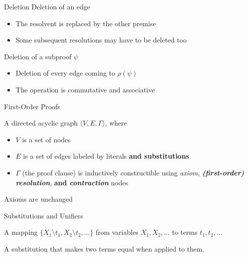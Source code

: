 {
\begin{frame}{Deletion}
Deletion of an edge\\
\begin{itemize}
\item The resolvent is replaced by the other premise
\item Some subsequent resolutions may have to be deleted too
\end{itemize}
\vspace{1cm}
Deletion of a subproof $\psi$\\
\begin{itemize}
\item Deletion of every edge coming to $\rho(\psi)$
\item The operation is commutative and associative
\end{itemize}
\end{frame}
}


{
\begin{frame}{First-Order Proofs}
\begin{definition}
A directed acyclic graph $\langle V,E,\Gamma \rangle$, where
\begin{itemize}
\item $V$ is a set of nodes
\item $E$ is a set of edges labeled by literals {\bf and substitutions}
\item $\Gamma$ (the proof clause) is inductively constructible using \emph{axiom}, {\bf\emph{(first-order) resolution}}, {\bf and \emph{contraction}} nodes
\end{itemize}
\end{definition}
\vspace{0.5cm}
Axioms are unchanged
\end{frame}
}

{
\begin{frame}{Substitutions and Unifiers}
\begin{definition}[Substitution]
A mapping $\{X_1\setminus t_1, X_2\setminus t_2,\ldots\}$ from variables $X_1,X_2,\ldots$ to terms $t_1,t_2,\ldots$
\end{definition}


\begin{definition}[Unifier]
A substitution that makes two terms equal when applied to them.
\end{definition}

\end{frame}
}

